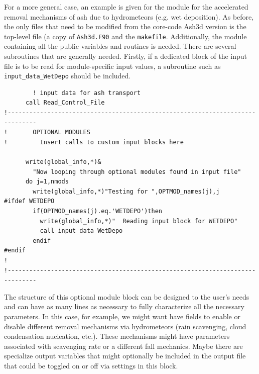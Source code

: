 For a more general case, an example is given for the module for the accelerated
removal mechanisms of ash due to hydrometeors (e.g. wet deposition).  As before,
the only files that need to be modified from the core-code Ash3d version is the
top-level file (a copy of \texttt{Ash3d.F90} and the \texttt{makefile}.  Additionally,
the module containing all the public variables and routines is needed.  There are
several subroutines that are generally needed.  Firstly, if a dedicated block of
the input file is to be read for module-specific input values, a subroutine such
as \texttt{input\_data\_WetDepo} should be included.

\small
\begin{verbatim}
        ! input data for ash transport
      call Read_Control_File
!------------------------------------------------------------------------------
!       OPTIONAL MODULES
!         Insert calls to custom input blocks here

      write(global_info,*)&
        "Now looping through optional modules found in input file"
      do j=1,nmods
        write(global_info,*)"Testing for ",OPTMOD_names(j),j
#ifdef WETDEPO
        if(OPTMOD_names(j).eq.'WETDEPO')then
          write(global_info,*)"  Reading input block for WETDEPO"
          call input_data_WetDepo
        endif
#endif
!
!------------------------------------------------------------------------------
\end{verbatim}
\normalsize
The structure of this optional module block can be designed to the user's needs
and can have as many lines as necessary to fully characterize all the necessary
parameters. In this case, for example, we might want have fields to enable or
disable different removal mechanisms via hydrometeors (rain scavenging, cloud
condensation nucleation, etc.). These mechanisms might have parameters associated
with scavenging rate or a different fall mechanics. Maybe there are specialize
output variables that might optionally be included in the output file that could
be toggled on or off via settings in this block.


